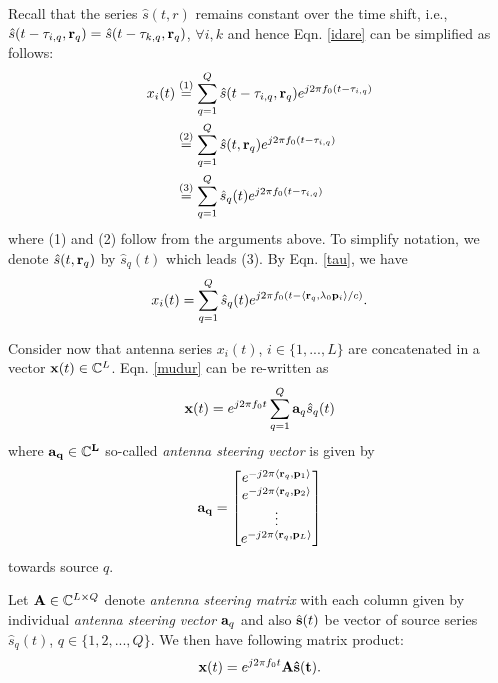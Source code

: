 \documentclass{article}
\begin{document}
Recall that the series $\hat{s}(t,r)$ remains constant over the time shift, i.e., $\hat{s}(t-\tau_{i,q},{\bf r}_q) = \hat{s}(t-\tau_{k,q},{\bf r}_q)$, $\forall i,k$ and hence Eqn. \ref{idare} can be simplified as follows:
\begin{equation}
\begin{split}
x_i(t) &\stackrel{(1)}{=} \sum_{q=1}^Q \hat{s}(t-\tau_{i,q},{\bf r}_q)e^{j2\pi f_0 (t-\tau_{i,q})}\\
&\stackrel{(2)}{=} \sum_{q=1}^Q \hat{s}(t, {\bf r}_q)e^{j2\pi f_0 (t-\tau_{i,q})}\\
&\stackrel{(3)}{=} \sum_{q=1}^Q \hat{s}_q(t)e^{j2\pi f_0 (t-\tau_{i,q})}
\end{split}
\end{equation}
where (1) and (2) follow from the arguments above. To simplify notation, we denote $\hat{s}(t,{\bf r}_q)$ by $\hat{s}_q(t)$ which leads (3).
By Eqn. \ref{tau}, we have
\begin{equation}\label{mudur}
x_i(t) = \sum_{q=1}^Q \hat{s}_q(t)e^{j2\pi f_0 (t- \langle {\bf r}_q,\lambda_0{\bf p}_i\rangle/c)}.
\end{equation}
 
Consider now that antenna series $x_i(t)$, $i\in \{ 1,...,L\}$ are concatenated in a vector ${\bf x}(t) \in \mathbb{C}^L$. Eqn. \ref{mudur} can be re-written as
 \begin{equation}
{\bf x}(t) = e^{j2\pi f_0 t} \sum_{q=1}^Q {\bf a}_q \hat{s}_q(t)\label{ind_xt}
\end{equation}
where $\bf{a}_q \in \mathbb{C}^L$ so-called {\it antenna steering vector} is given by
\begin{equation}\label{steering}
\bf{a}_q =
  \begin{bmatrix}
    e^{-j2\pi \langle {\bf r}_q, {\bf p}_1 \rangle}   \\
    e^{-j2\pi \langle {\bf r}_q, {\bf p}_2 \rangle}    \\
    \vdots \\
    e^{-j2\pi \langle {\bf r}_q, {\bf p}_L \rangle}   
  \end{bmatrix}
 \end{equation}
 towards source $q$.
 
Let ${\bf A} \in \mathbb{C}^{L\times Q}$ denote {\it antenna steering matrix} with each column given by individual {\it antenna steering vector} ${\bf a}_q$ and also $\hat{\bf{s}}(t)$ be vector of source series $\hat{s}_q(t)$, $q \in \{ 1,2,...,Q \}$. We then have following matrix product:
 \begin{equation}
 {\bf x}(t) = e^{j2\pi f_0 t}\bf{A} \hat{\bf{s}}(t).
 \end{equation}
 
\end{document}
